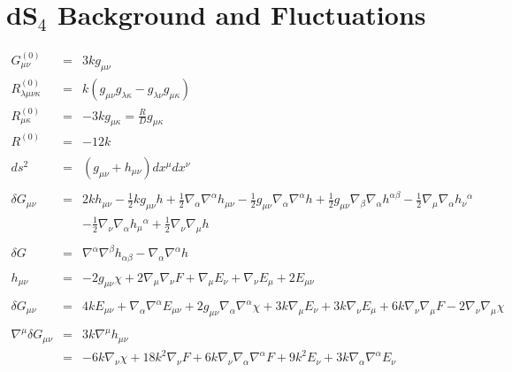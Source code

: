 \documentclass[10pt,letterpaper]{article}
\numberwithin{equation}{section}
\begin{document}
\section{dS$_4$ Background and Fluctuations}
\begin{eqnarray}
G^{(0)}_{\mu\nu} &=& 3kg_{\mu\nu}
\nonumber\\
R^{(0)}_{\lambda\mu\nu\kappa} &=& k(g_{\mu\nu}g_{\lambda\kappa}-g_{\lambda\nu}g_{\mu\kappa})
\nonumber\\
R^{(0)}_{\mu\kappa} &=& -3k g_{\mu\kappa} = \frac{R}{D}g_{\mu\kappa}
\nonumber\\
R^{(0)}&=& -12 k
\nonumber\\ \nonumber\\
ds^2 &=& (g_{\mu\nu} + h_{\mu\nu})dx^\mu dx^\nu
\nonumber\\ \nonumber\\
\delta G_{\mu\nu}&=& 2 k h_{\mu \nu}
-  \tfrac{1}{2} k g_{\mu \nu} h
+ \tfrac{1}{2} \nabla_{\alpha}\nabla^{\alpha}h_{\mu \nu}
-  \tfrac{1}{2} g_{\mu \nu} \nabla_{\alpha}\nabla^{\alpha}h
+ \tfrac{1}{2} g_{\mu \nu} \nabla_{\beta}\nabla_{\alpha}h^{\alpha \beta}
-  \tfrac{1}{2} \nabla_{\mu}\nabla_{\alpha}h_{\nu}{}^{\alpha}\nonumber\\
&& -  \tfrac{1}{2} \nabla_{\nu}\nabla_{\alpha}h_{\mu}{}^{\alpha}
+ \tfrac{1}{2} \nabla_{\nu}\nabla_{\mu}h
\nonumber\\ \nonumber\\
\delta G &=&  \nabla^\alpha \nabla^\beta h_{\alpha\beta} - \nabla_\alpha\nabla^\alpha h
\nonumber\\ \nonumber\\
h_{\mu\nu} &=& -2g_{\mu\nu}\chi +2\nabla_\mu\nabla_\nu F + \nabla_\mu E_\nu + \nabla_\nu E_\mu + 2E_{\mu\nu}
\nonumber\\ \nonumber\\
\delta G_{\mu\nu} &=& 4 k E_{\mu \nu} + \nabla_{\alpha}\nabla^{\alpha}E_{\mu \nu} + 2 g_{\mu \nu} \nabla_{\alpha}\nabla^{\alpha}\chi + 3 k \nabla_{\mu}E_{\nu} + 3 k \nabla_{\nu}E_{\mu} + 6 k \nabla_{\nu}\nabla_{\mu}F - 2 \nabla_{\nu}\nabla_{\mu}\chi
\nonumber\\ \nonumber\\
\nabla^\mu \delta G_{\mu\nu} &=& 3k\nabla^\mu h_{\mu\nu} 
\nonumber\\
&=&  - 6 k \nabla_{\nu}\chi+ 18 k^2 \nabla_{\nu}F + 6 k \nabla_{\nu}\nabla_{\alpha}\nabla^{\alpha}F+ 9 k^2 E_{\nu} + 3 k \nabla_{\alpha}\nabla^{\alpha}E_{\nu}
\nonumber\\ \nonumber\\

\end{eqnarray}
\end{document}
